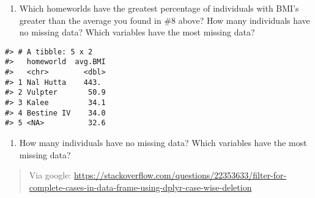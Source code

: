\documentclass[
]{book}
\providecommand{\tightlist}{%
  \setlength{\itemsep}{0pt}\setlength{\parskip}{0pt}}
\begin{document}
\begin{enumerate}
\def\labelenumi{\arabic{enumi}.}
\setcounter{enumi}{8}
\tightlist
\item
  Which homeworlds have the greatest percentage of individuals with BMI's greater than the average you found in \#8 above?
  How many individuals have no missing data? Which variables have the most missing data?
\end{enumerate}

\begin{verbatim}
#> # A tibble: 5 x 2
#>   homeworld  avg.BMI
#>   <chr>        <dbl>
#> 1 Nal Hutta    443. 
#> 2 Vulpter       50.9
#> 3 Kalee         34.1
#> 4 Bestine IV    34.0
#> 5 <NA>          32.6
\end{verbatim}

\begin{enumerate}
\def\labelenumi{\arabic{enumi}.}
\setcounter{enumi}{9}
\tightlist
\item
  How many individuals have no missing data? Which variables have the most missing data?
\end{enumerate}

\begin{quote}
Via google: \url{https://stackoverflow.com/questions/22353633/filter-for-complete-cases-in-data-frame-using-dplyr-case-wise-deletion}
\end{quote}
\end{document}
